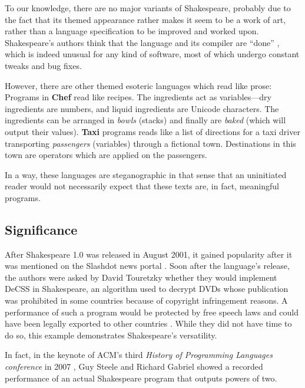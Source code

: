 To our knowledge, there are no major variants of Shakespeare, probably due to the fact that its themed appearance rather makes it seem to be a work of art, rather than a language specification to be improved and worked upon. Shakespeare's authors think that the language and its compiler are “done” \cite{herrick2011az}, which is indeed unusual for any kind of software, most of which undergo constant tweaks and bug fixes.

However, there are other themed esoteric languages which read like prose: Programs in \textbf{Chef} read like recipes. The ingredients act as variables---dry ingredients are numbers, and liquid ingredients are Unicode characters. The ingredients can be arranged in \emph{bowls} (stacks) and finally are \emph{baked} (which will output their values). \textbf{Taxi} programs reads like a list of directions for a taxi driver transporting \emph{passengers} (variables) through a fictional town. Destinations in this town are operators which are applied on the passengers.

In a way, these languages are steganographic in that sense that an uninitiated reader would not necessarily expect that these texts are, in fact, meaningful programs.

\subsection{Significance}

After Shakespeare 1.0 was released in August 2001, it gained popularity after it was mentioned on the Slashdot news portal \cite{tjernlund2001shakespeare}. Soon after the language's release, the authors were asked by David Touretzky whether they would implement DeCSS in Shakespeare, an algorithm used to decrypt DVDs whose publication was prohibited in some countries because of copyright infringement reasons. A performance of such a program would be protected by free speech laws and could have been legally exported to other countries \cite{herrick2011az}. While they did not have time to do so, this example demonstrates Shakespeare's versatility.

In fact, in the keynote of ACM's third \emph{History of Programming Languages conference} in 2007 \cite{chapiewski2007computational}, Guy Steele and Richard Gabriel showed a recorded performance of an actual Shakespeare program that outputs powers of two.

